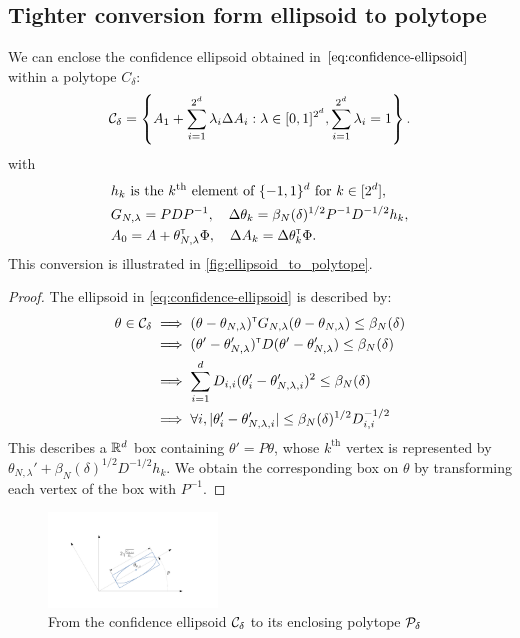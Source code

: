 \documentclass{article}
\begin{document}
\subsection{Tighter conversion form ellipsoid to polytope}
\label{sec:tight-polytope}
\begin{lemma}
\label{lem:tight_polytope}
We can enclose the confidence ellipsoid obtained in $\eqref{eq:confidence-ellipsoid}$ within a polytope $C_\delta$:
\begin{equation}
     \mathcal{C}_\delta = \left\{ A_{1}+\sum_{i=1}^{2^d}\lambda_{i}\Delta A_{i}: \lambda\in[0, 1]^{2^d},  \sum_{i=1}^{2^d}\lambda_{i}=1\right\}.
\end{equation}
with 
\begin{align*}
    &h_k \text{ is the }k^\text{th}\text{ element of }\{-1,1\}^d\text{ for } k\in[2^d],\\
    &G_{N,\lambda} = PDP^{-1}, \quad \Delta\theta_k = \beta_{N}(\delta)^{1/2} P^{-1}D^{-1/2} h_k, \\
    &A_0 = A + \theta_{N,\lambda}^{\mathsf{\scriptscriptstyle T}}\Phi, \quad \Delta A_k = \Delta\theta_k^{\mathsf{\scriptscriptstyle T}}\Phi.
\end{align*}
This conversion is illustrated in \autoref{fig:ellipsoid_to_polytope}.
\end{lemma}

\begin{proof}
The ellipsoid in \eqref{eq:confidence-ellipsoid} is described by:
\begin{align*}
    \theta\in\mathcal{C}_\delta &\implies
    (\theta-\theta_{N,\lambda})^{\mathsf{\scriptscriptstyle T}} G_{N,\lambda}(\theta-\theta_{N,\lambda}) \leq \beta_{N}(\delta)\\
    &\implies (\theta'-\theta'_{N,\lambda})^{\mathsf{\scriptscriptstyle T}} D (\theta'-\theta'_{N,\lambda}) \leq \beta_{N}(\delta)\\
    &\implies \sum_{i=1}^d D_{i,i}(\theta'_i-\theta'_{N,\lambda,i})^2\leq \beta_{N}(\delta)\\
    &\implies\forall i, |\theta'_i-\theta'_{N,\lambda,i}|\leq \beta_{N}(\delta)^{1/2}D_{i,i}^{-1/2}
\end{align*}
This describes a $\mathbb{R}^d$ box containing $\theta' = P\theta$, whose $k^\text{th}$ vertex is represented by $\theta_{N,\lambda}' + \beta_{N}(\delta)^{1/2}D^{-1/2} h_k$. We obtain the corresponding box on $\theta$ by transforming each vertex of the box with $P^{-1}$.
\end{proof}

\begin{figure}
    \centering
    \includegraphics[trim={3.8cm, 2cm, 5cm, 3.8cm}, clip, width=0.4\textwidth]{img/ellipsoid_to_polytope}
    \caption{From the confidence ellipsoid $\mathcal{C}_\delta$ to its enclosing polytope $\mathcal{P}_\delta$}
    \label{fig:ellipsoid_to_polytope}
\end{figure}
\end{document}
